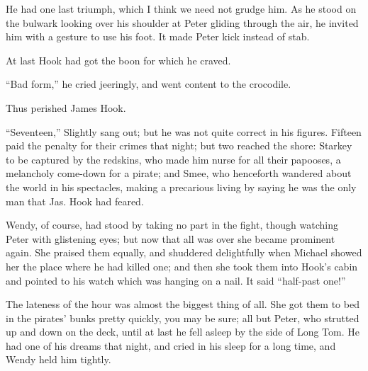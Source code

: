 He had one last triumph, which I think we need not grudge him. As he
stood on the bulwark looking over his shoulder at Peter gliding through
the air, he invited him with a gesture to use his foot. It made Peter
kick instead of stab.

At last Hook had got the boon for which he craved.

``Bad form,'' he cried jeeringly, and went content to the crocodile.

Thus perished James Hook.

``Seventeen,'' Slightly sang out; but he was not quite correct in his
figures. Fifteen paid the penalty for their crimes that night; but two
reached the shore: Starkey to be captured by the redskins, who made him
nurse for all their papooses, a melancholy come-down for a pirate; and
Smee, who henceforth wandered about the world in his spectacles, making
a precarious living by saying he was the only man that Jas. Hook had
feared.

Wendy, of course, had stood by taking no part in the fight, though
watching Peter with glistening eyes; but now that all was over she
became prominent again. She praised them equally, and shuddered
delightfully when Michael showed her the place where he had killed one;
and then she took them into Hook's cabin and pointed to his watch which
was hanging on a nail. It said ``half-past one!''

The lateness of the hour was almost the biggest thing of all. She got
them to bed in the pirates' bunks pretty quickly, you may be sure; all
but Peter, who strutted up and down on the deck, until at last he fell
asleep by the side of Long Tom. He had one of his dreams that night,
and cried in his sleep for a long time, and Wendy held him tightly.